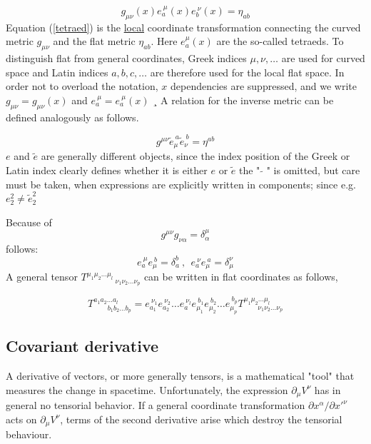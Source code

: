 \documentclass[12pt,a4paper]{article}
\begin{document}
	\begin{equation}
		\label{tetraed}
		g_{\mu \nu}(x)  e_a^{\ \mu}(x) e_b^{\ \nu}(x) = \eta_{a b}
	\end{equation}
	Equation (\ref{tetraed}) is the \underline{local} coordinate transformation connecting the curved metric $g_{\mu \nu}$ and the flat metric $\eta_{ab}$. Here $e_a^\mu(x)$ are the so-called tetraeds. To distinguish flat from general coordinates, Greek indices $\mu,\nu,\ldots$ are used for curved space and
	Latin indices $a,b,c,\ldots$ are therefore used for the local flat space. In order not to overload the notation, $x$ dependencies are suppressed, and we write $g_{\mu\nu} = g_{\mu\nu}(x)$ and $e_a^{\ \mu } = e_a^{\ \mu}(x)$
	¸
	A relation for the inverse metric can be defined analogously as follows.
	
	
	\begin{equation}
		\label{tetraed}
		g^{\mu \nu}  \tilde{e}_\mu^{\ a} \tilde{e}_\nu^{\ b} = \eta^{a b}
	\end{equation}
	 $e$ and $\tilde{e}$ are generally different objects, since the index position of the Greek or Latin index clearly defines whether it is either $e$ or $\tilde{e}$ the " $\tilde{}$ " is omitted, but care must be taken, when expressions are explicitly written in components; since e.g. $e^2_2 \neq \tilde{e}^2_2$
	 

	Because of
	$$g^{\mu\nu}g_{\nu\alpha}=\delta^\mu_\alpha$$
	follows: 
	$$
	e_a^{\ \mu}e_\mu^{\ b} = \delta_a^b \ , \ \ e_a^{\ \nu}e_\mu^{\ a} = \delta_\mu^\nu
	$$
	A general tensor $T^{\mu_1 \mu_2 \ldots \mu_l}\,_{\nu_1 \nu_2 \ldots \nu_p}$ can be written in flat coordinates as follows,
	
	

	\begin{equation}
		T^{a_1 a_2 \ldots a_l}_{\ \ \ \ \ \ \ \ \ b_1 b_2 \ldots b_p} = e_{a_1}^{\ \nu_1} e_{a_2}^{\ \nu_2} \ldots e_{a}^{\ \nu_l} e_{\mu_1}^{\ b_1} e_{\mu_2}^{\ b_2} \ldots e_{\mu_p}^{\ b_p} T^{\mu_1 \mu_2 \ldots \mu_l}_{\ \ \ \ \ \ \ \ \ \nu_1 \nu_2 \ldots \nu_p}
	\end{equation}
	
	\subsection{Covariant derivative}
	A derivative of vectors, or more generally tensors, is a mathematical "tool" that measures the change in spacetime. Unfortunately, the expression $\partial_\mu V^\nu$ has in general no tensorial behavior. If a general coordinate transformation $\partial x^\alpha/ \partial x'^\nu$ acts on $\partial_\mu V^\nu$, terms of the second derivative arise which destroy the tensorial behaviour.
	 
\end{document}
